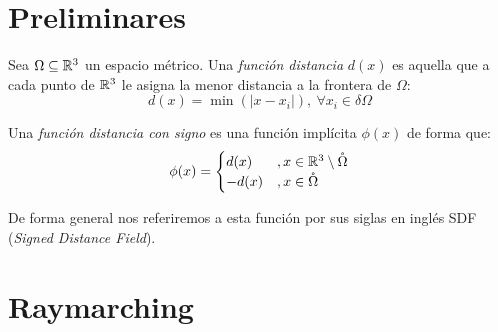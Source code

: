 
\section{Preliminares}

\begin{definicion}
    Sea $\Omega \subseteq \mathbb{R}^3$ un espacio métrico. Una \textit{función distancia} $d(x)$ es aquella que a cada punto de $\mathbb{R}^3$ le asigna la menor distancia a la frontera de $\Omega$:
    \begin{equation*}
        d(x) = \min(|x-x_i|),\ \forall x_i \in \delta\Omega
    \end{equation*}
\end{definicion}

\begin{definicion}[SDF]
    Una \textit{función distancia con signo} es una función implícita $\phi(x)$ de forma que:
    \begin{equation*}
        \phi(x) = \begin{cases}
            d(x)  & , x\in \mathbb{R}^3\setminus \mathring{\Omega} \\
            -d(x) & , x\in \mathring{\Omega}
        \end{cases}
    \end{equation*}

    De forma general nos referiremos a esta función por sus siglas en inglés SDF (\textit{Signed Distance Field}).
\end{definicion}

\section{Raymarching}

